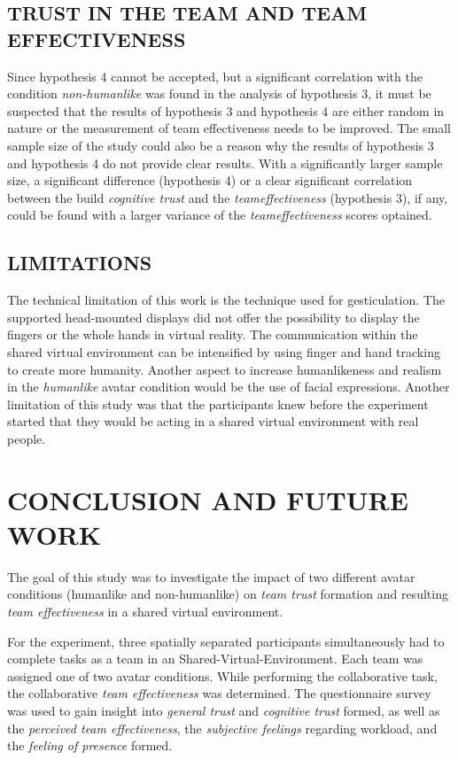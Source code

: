 \documentclass[sigchi]{acmart}
\begin{document}
\subsection{TRUST IN THE TEAM AND TEAM EFFECTIVENESS}
Since hypothesis 4 cannot be accepted, but a significant correlation with the condition \textit{non-humanlike} was found in the analysis of hypothesis 3, it must be suspected that the results of hypothesis 3 and hypothesis 4 are either random in nature or the measurement of team effectiveness needs to be improved.
The small sample size of the study could also be a reason why the results of hypothesis 3 and hypothesis 4 do not provide clear results. With a significantly larger sample size, a significant difference (hypothesis 4) or a clear significant correlation between the build \textit{cognitive trust} and the \textit{teameffectiveness} (hypothesis 3), if any, could be found with a larger variance of the \textit{teameffectiveness} scores optained.

\subsection{LIMITATIONS}
The technical limitation of this work is the technique used for gesticulation. The supported head-mounted displays did not offer the possibility to display the fingers or the whole hands in virtual reality. The communication within the shared virtual environment can be intensified by using finger and hand tracking to create more humanity. Another aspect to increase humanlikeness and realism in the \textit{humanlike} avatar condition would be the use of facial expressions.
Another limitation of this study was that the participants knew before the experiment started that they would be acting in a shared virtual environment with real people.

\section{CONCLUSION AND FUTURE WORK}
The goal of this study was to investigate the impact of two different avatar conditions (humanlike and non-humanlike) on \textit{team trust} formation and resulting \textit{team effectiveness} in a shared virtual environment. 

For the experiment, three spatially separated participants simultaneously had to complete tasks as a team in an Shared-Virtual-Environment. Each team was assigned one of two avatar conditions. While performing the collaborative task, the collaborative \textit{team effectiveness} was determined. The questionnaire survey was used to gain insight into \textit{general trust} and \textit{cognitive trust} formed, as well as the \textit{perceived team effectiveness}, the \textit{subjective feelings} regarding workload, and the \textit{feeling of presence} formed.
\end{document}
